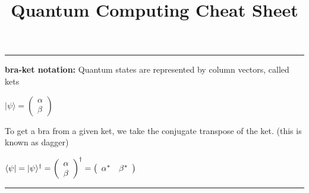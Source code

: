 \documentclass{article}
\title{\vspace{-4cm}            %
Quantum Computing Cheat Sheet
\vspace{-1cm}}
\date{} %
\begin{document}
\maketitle
\hrule 
\vspace{5pt}

\textbf{bra-ket notation:} Quantum states are represented by column vectors, called kets
\begin{center}
$ |{\psi} \rangle = \left( 
				\begin{array}{c}
					 {\alpha}\\
					 {\beta}
				\end{array} 
			\right)$
\end{center}

\noindent To get a bra from a given ket, we take the conjugate transpose of the ket. (this is known as dagger)
\begin{center}
$\langle{\psi}| = |{\psi} \rangle^\dagger = 
			 \left(
				 \begin{array}{c} 
				 	{\alpha}\\
					{\beta}
				\end{array} 
			\right)^\dagger = \left( \begin{array}{c c} {\alpha}^* &  {\beta}^* \end{array} \right)$\\
\end{center}

\hrule 
\vspace{5pt}
\end{document}
